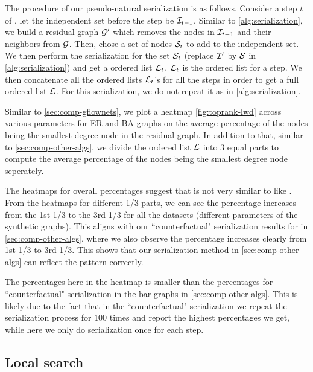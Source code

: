 The procedure of our pseudo-natural serialization is as follows. Consider a step $t$ of \lwd, let the independent set before the step be ${\mathcal{I}}_{t-1}$. Similar to \cref{alg:serialization}, we build a residual graph ${\mathcal{G}}'$ which removes the nodes in ${\mathcal{I}}_{t-1}$ and their neighbors from ${\mathcal{G}}$. Then, \lwd chose a set of nodes ${\mathcal{S}}_t$ to add to the independent set. We then perform the serialization for the set ${\mathcal{S}}_t$ (replace ${\mathcal{I}}'$ by ${\mathcal{S}}$ in \cref{alg:serialization}) and get a ordered list ${\mathcal{L}}_t$.  ${\mathcal{L}}_t$ is the ordered list for a step. We then concatenate all the ordered lists  ${\mathcal{L}}_t$'s for all the steps in order to get a full ordered list ${\mathcal{L}}$. For this serialization, we do not repeat it as in \cref{alg:serialization}.

Similar to \cref{sec:comp-gflownets}, we plot a heatmap \cref{fig:toprank-lwd} across various parameters for ER and BA graphs on the average percentage of the nodes being the smallest degree node in the residual graph. In addition to that, similar to \cref{sec:comp-other-algs}, we divide the ordered list ${\mathcal{L}}$ into $3$ equal parts to compute the average percentage of the nodes being the smallest degree node seperately.


The heatmaps for overall percentages suggest that \lwd is not very similar to \deggreedy like \gflownets. From the heatmaps for different 1/3 parts, we can see the percentage increases from the 1st 1/3 to the 3rd 1/3 for all the datasets (different parameters of the synthetic graphs). This aligns with our ``counterfactual" serialization results for \lwd in \cref{sec:comp-other-algs}, where we also observe the percentage increases clearly from 1st 1/3 to 3rd 1/3. This shows that our serialization method in \cref{sec:comp-other-algs} can reflect the pattern correctly.

The percentages here in the heatmap is smaller than the percentages for ``counterfactual" serialization in the bar graphs in \cref{sec:comp-other-algs}. This is likely due to the fact that in the ``counterfactual" serialization we repeat the serialization process for $100$ times and report the highest percentages we get, while here we only do serialization once for each step.

\subsection{Local search}\label{sec:more-exp-ls}



